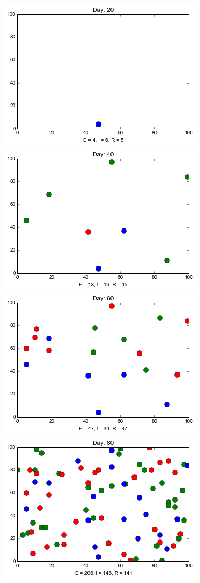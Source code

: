 \begin{figure}
\medskip
\includegraphics[scale=0.25]{images/2t20.png} \quad
\includegraphics[scale=0.25]{images/2t40.png} \quad
\includegraphics[scale=0.25]{images/2t60.png} \quad
\includegraphics[scale=0.25]{images/2t80.png} 


\end{figure}
